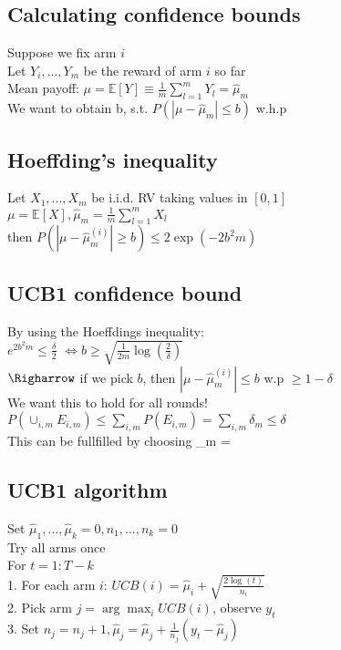 \subsection*{Calculating confidence bounds}
Suppose we fix arm $i$\\
Let $Y_i,...,Y_m$ be the reward of arm $i$ so far\\
Mean payoff: $\mu=\mathbb{E}[Y] \equiv \frac{1}{m}\sum_{l=1}^m Y_l = \hat{\mu}_m$\\
We want to obtain b, s.t. $P(|\mu - \hat{\mu}_m|\leq b)$ w.h.p

\subsection*{Hoeffding's inequality}
Let $X_1,...,X_m$ be i.i.d. RV taking values in $[0,1]$\\
$\mu = \mathbb{E}[X], \hat{\mu}_m = \frac{1}{m} \sum_{l=1}^m X_l$\\
then $P(|\mu - \hat{\mu}_m^{(i)}| \geq b) \leq 2 \exp (-2b^2m)$

\subsection*{UCB1 confidence bound}
By using the Hoeffdings inequality:\\
$e^{2b^2m} \leq \frac{\delta}{2}$
$\Leftrightarrow b \geq \sqrt{\frac{1}{2m} \log(\frac{2}{\delta})}$\\
$\Righarrow$ if we pick $b$, then $|\mu - \hat{\mu}_m^{(i)}| \leq b$ w.p $\geq 1-\delta$\\
We want this to hold for all rounds!\\
$P(\cup_{i,m} E_{i,m}) \leq \sum_{i,m} P(E_{i,m}) = \sum_{i,m} \delta_m \leq \delta$\\
This can be fullfilled by choosing \delta_m = \delta

\subsection*{UCB1 algorithm}
Set $\hat{\mu}_1,...,\hat{\mu}_k=0, n_1,...,n_k=0$\\
Try all arms once\\
For $t = 1:T-k$\\
1. For each arm $i$: $UCB(i) = \hat{\mu}_i + \sqrt{\frac{2 \log(t)}{n_i}}$\\
2. Pick arm $j = \arg \max_i UCB(i)$, observe $y_t$\\
3. Set $n_j = n_j + 1, \hat{\mu}_j = \hat{\mu}_j + \frac{1}{n_j} (y_t - \hat{\mu}_j)$

